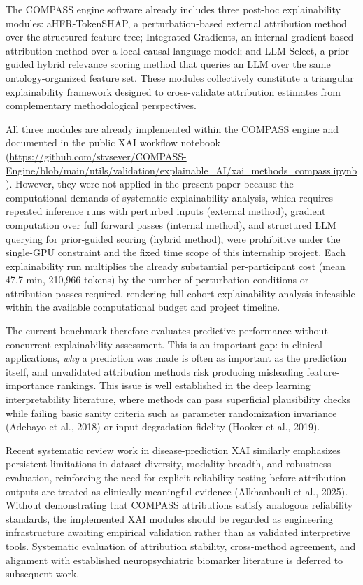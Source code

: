 \documentclass[11pt,a4paper,twoside]{article}
\begin{document}
The COMPASS engine software already includes three post-hoc explainability modules: aHFR-TokenSHAP, a perturbation-based external attribution method over the structured feature tree; Integrated Gradients, an internal gradient-based attribution method over a local causal language model; and LLM-Select, a prior-guided hybrid relevance scoring method that queries an LLM over the same ontology-organized feature set. These modules collectively constitute a triangular explainability framework designed to cross-validate attribution estimates from complementary methodological perspectives.

All three modules are already implemented within the COMPASS engine and documented in the public XAI workflow notebook (\url{https://github.com/stvsever/COMPASS-Engine/blob/main/utils/validation/explainable_AI/xai_methods_compass.ipynb}). However, they were not applied in the present paper because the computational demands of systematic explainability analysis, which requires repeated inference runs with perturbed inputs (external method), gradient computation over full forward passes (internal method), and structured LLM querying for prior-guided scoring (hybrid method), were prohibitive under the single-GPU constraint and the fixed time scope of this internship project. Each explainability run multiplies the already substantial per-participant cost (mean 47.7 min, 210,966 tokens) by the number of perturbation conditions or attribution passes required, rendering full-cohort explainability analysis infeasible within the available computational budget and project timeline.

The current benchmark therefore evaluates predictive performance without concurrent explainability assessment. This is an important gap: in clinical applications, \textit{why} a prediction was made is often as important as the prediction itself, and unvalidated attribution methods risk producing misleading feature-importance rankings. This issue is well established in the deep learning interpretability literature, where methods can pass superficial plausibility checks while failing basic sanity criteria such as parameter randomization invariance (Adebayo et al., 2018) or input degradation fidelity (Hooker et al., 2019).

Recent systematic review work in disease-prediction XAI similarly emphasizes persistent limitations in dataset diversity, modality breadth, and robustness evaluation, reinforcing the need for explicit reliability testing before attribution outputs are treated as clinically meaningful evidence (Alkhanbouli et al., 2025). Without demonstrating that COMPASS attributions satisfy analogous reliability standards, the implemented XAI modules should be regarded as engineering infrastructure awaiting empirical validation rather than as validated interpretive tools. Systematic evaluation of attribution stability, cross-method agreement, and alignment with established neuropsychiatric biomarker literature is deferred to subsequent work.
\end{document}
